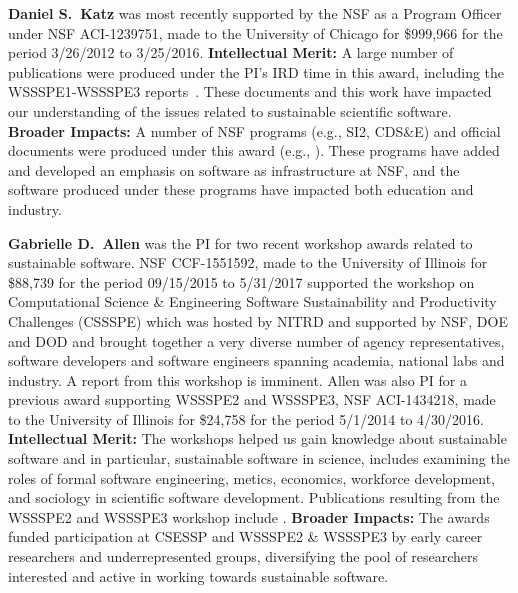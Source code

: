 \documentclass[11pt]{article}
\begin{document}
\textbf{Daniel S.~Katz}
was most recently supported by the NSF as a Program Officer under NSF ACI-1239751, made to the University of Chicago for \$999,966 for the period 3/26/2012 to 3/25/2016.  {\bf Intellectual Merit:} A large number of publications were produced under the PI's IRD time in this award, including the WSSSPE1-WSSSPE3 reports~\cite{WSSSPE1, WSSSPE2, WSSSPE3}. These documents and this work have impacted our understanding of the issues related to sustainable scientific software.  {\bf Broader Impacts:}
A number of NSF programs (e.g., SI2, CDS\&E) and official documents were produced under this award (e.g., \cite{NSF_software_vision}).  These programs have added and developed an emphasis on software as infrastructure at NSF, and the software produced under these programs have impacted both education and industry.

\textbf{Gabrielle D.~Allen}
was the PI for two recent workshop awards related to sustainable software. NSF CCF-1551592, made to the University of Illinois for \$88,739 for the period 09/15/2015 to 5/31/2017 supported the workshop on Computational Science \& Engineering Software Sustainability and Productivity Challenges (CSSSPE) which was hosted by NITRD and supported by NSF, DOE and DOD and brought together a very diverse number of agency representatives, software developers and software engineers spanning academia, national labs and industry. A report from this workshop is imminent. 
Allen was also PI for a previous award supporting WSSSPE2 and WSSSPE3, NSF ACI-1434218, made to the University of Illinois for \$24,758 for the period 5/1/2014 to 4/30/2016.  {\bf Intellectual Merit:} The workshops helped us gain knowledge about sustainable software and in particular, sustainable software in science, includes examining the roles of formal software engineering, metics, economics, workforce development, and sociology in scientific software development.
Publications  resulting from the WSSSPE2 and WSSSPE3 workshop include \cite{WSSSPE2-collection, WSSSPE2, WSSSPE3}. {\bf Broader Impacts:} The awards funded participation at CSESSP and WSSSPE2 \& WSSSPE3 by early career researchers and underrepresented groups, diversifying the pool of researchers interested and active in working towards sustainable software.
\end{document}
